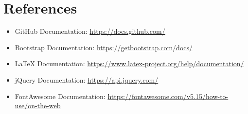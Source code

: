 \documentclass{article}
\begin{document}
\section{References}
\begin{itemize}
    \item GitHub Documentation: \url{https://docs.github.com/}
    \item Bootstrap Documentation: \url{https://getbootstrap.com/docs/}
    \item LaTeX Documentation: \url{https://www.latex-project.org/help/documentation/}
    \item jQuery Documentation: \url{https://api.jquery.com/}
    \item FontAwesome Documentation: \url{https://fontawesome.com/v5.15/how-to-use/on-the-web}
\end{itemize}
\end{document}
